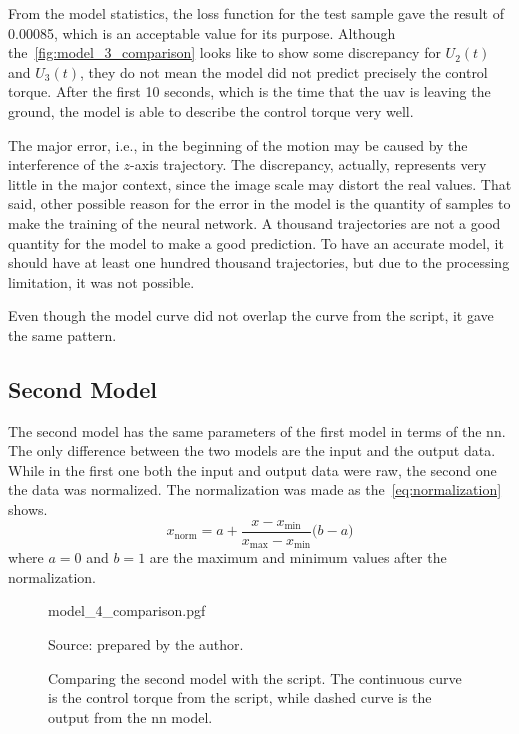 From the model statistics, the loss function for the test sample gave the result of 0.00085, which is an acceptable value for its purpose.
Although the~\cref{fig:model_3_comparison} looks like to show some discrepancy for \(U_2(t)\) and \(U_3(t)\), they do not mean the model did not predict precisely the control torque. 
After the first 10 seconds, which is the time that the \gls*{uav} is leaving the ground, the model is able to describe the control torque very well.

The major error, i.e., in the beginning of the motion may be caused by the interference of the \(z\)-axis trajectory. 
The discrepancy, actually, represents very little in the major context, since the image scale may distort the real values.
That said, other possible reason for the error in the model is the quantity of samples to make the training of the neural network. 
A thousand trajectories are not a good quantity for the model to make a good prediction.
To have an accurate model, it should have at least one hundred thousand trajectories, but due to the processing limitation, it was not possible.

Even though the model curve did not overlap the curve from the script, it gave the same pattern.

\subsection{Second Model}

The second model has the same parameters of the first model in terms of the \gls*{nn}.
The only difference between the two models are the input and the output data.
While in the first one both the input and output data were raw, the second one the data was normalized.
The normalization was made as the~\cref{eq:normalization} shows.
%
\begin{equation}\label{eq:normalization}
    x_{\text{norm}} = a + \frac{x - x_{\text{min}}}{x_{\text{max}} - x_{\text{min}}} \Big(b-a\Big)
\end{equation}
%
where \(a=0\) and \(b=1\) are the maximum and minimum values after the normalization.

\begin{figure}[!htb]
    \centering
    \caption[Comparing the second model with the script]{Comparing the second model with the script. The continuous curve is the control torque from the script, while dashed curve is the output from the \gls*{nn} model.}
    {model_4_comparison.pgf}

    {\footnotesize Source: prepared by the author.}
    \label{fig:model_4_comparison}
\end{figure}

